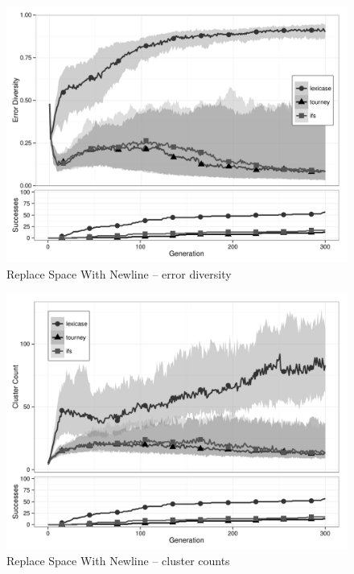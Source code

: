 \begin{figure}[p] %
\centering
\includegraphics[width=11.5cm]{replace-space-with-newline-diversity.pdf}
\caption{Replace Space With Newline -- error diversity}
\label{rswnDiv}
\end{figure}

\begin{figure}[p] %
\centering
\includegraphics[width=11.5cm]{replace-space-with-newline-cluster.pdf}
\caption{Replace Space With Newline -- cluster counts}
\label{rswnClu}
\end{figure}

